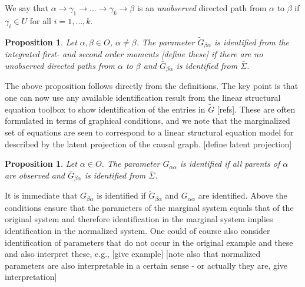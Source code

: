 \documentclass[accepted]{uai2021} %
\newtheorem{prop}[thm]{Proposition}
\begin{document}
We say that $\alpha \rightarrow \gamma_1 \rightarrow \ldots \rightarrow 
\gamma_k \rightarrow \beta$ is an \emph{unobserved} directed path from $\alpha$ 
to $\beta$ if $\gamma_i \in U$ for all $i = 1,\ldots, k$. 

\begin{prop}
	Let $\alpha,\beta \in O$, $\alpha\neq \beta$. The parameter 
	$\tilde{G}_{\beta\alpha}$ is 
	identified 
	from the integrated first- and second order moments [define these] if there 
	are no unobserved directed paths from 
	$\alpha$ to $\beta$ and $\bar{G}_{\beta\alpha}$ is identified from 
	$\bar{\Sigma}$.
\end{prop}

The above proposition follows directly from the definitions. The key point is 
that one can now use any available identification result from the linear 
structural equation toolbox to show identification of the entries in 
$\tilde{G}$ [refs]. These are often formulated in terms of graphical 
conditions, and we note that the 
marginalized set of equations are seen to correspond to a linear structural 
equation model for described by the latent projection of the causal graph. 
[define latent projection]

\begin{prop}
	Let $\alpha\in O$. The parameter $G_{\alpha\alpha}$ is identified if all 
	parents of $\alpha$ are observed and $\bar{G}_{\beta\alpha}$ is identified 
	from 
	$\bar{\Sigma}$.
\end{prop}

It is immediate that $G_{\beta\alpha}$ is identified if 
$\tilde{G}_{\beta\alpha}$ and $G_{\alpha\alpha}$ are identified. Above the 
conditions ensure that the parameters of the marginal system equals that of the 
original system and therefore identification in the marginal system implies 
identification in the normalized system. One could of course also consider 
identification of parameters that do not occur in the original example and 
these and also interpret these, e.g., [give example] [note also that normalized 
parameters are also interpretable in a certain sense - or actually they are, 
give interpretation]
\end{document}
